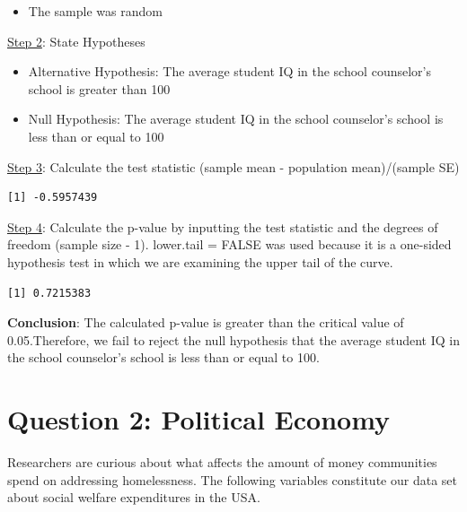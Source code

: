 \documentclass[12pt,letterpaper]{article}
\begin{document}
\begin{enumerate}
\begin{itemize}
	\item The sample was random
	\end{itemize}

\noindent \underline{Step 2}: State Hypotheses

	\begin{itemize}
\item Alternative Hypothesis: The average student IQ in the school counselor's school is greater than 100

\item Null Hypothesis: The average student IQ in the school counselor's school is less than or equal to 100 
	\end{itemize}
	
\noindent \underline{Step 3}: Calculate the test statistic (sample mean - population mean)/(sample SE)\\



\begin{verbatim}
[1] -0.5957439
\end{verbatim}

\noindent \underline{Step 4}: Calculate the p-value by inputting the test statistic and the degrees of freedom (sample size - 1). lower.tail = FALSE was used because it is a one-sided hypothesis test in which we are examining the upper tail of the curve.



\begin{verbatim}
[1] 0.7215383
\end{verbatim}

\noindent \textbf{Conclusion}: The calculated p-value is greater than the critical value of 0.05.\break Therefore, we fail to reject the null hypothesis that the average student IQ in the school counselor's school is less than or equal to 100.

\end{enumerate}

\newpage

	\section*{Question 2: Political Economy}

\noindent Researchers are curious about what affects the amount of money communities spend on addressing homelessness. The following variables constitute our data set about social welfare expenditures in the USA. \\
\vspace{.5cm}
\end{document}
